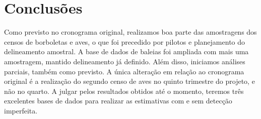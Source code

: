 \section{Conclusões} %
Como previsto no cronograma original, realizamos boa parte das amostragens dos censos de borboletas e aves,
o que foi precedido por pilotos e planejamento do delineamento amostral. 
A base de dados de baleias foi ampliada com mais uma
amostragem, mantido delineamento já definido. 
Além disso, iniciamos análises parciais, também como previsto.
A única alteração em relação ao cronograma original 
é a realização do segundo censo de aves no quinto trimestre do projeto, e não no quarto. 
A julgar pelos resultados obtidos até o momento, teremos três excelentes bases de dados para realizar
as estimativas com e sem detecção imperfeita.